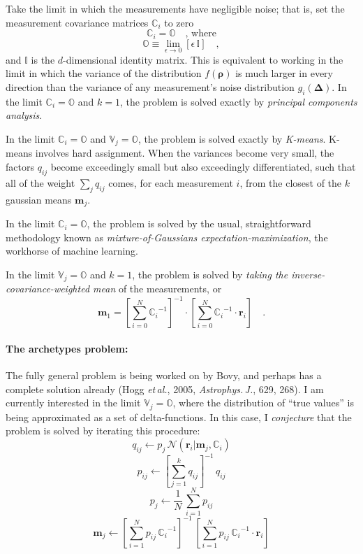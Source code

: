\documentclass[12pt]{article}
\newcommand{\etal}{\emph{et\,al.}}
\newcommand{\ApJ}{\emph{Astrophys.\,J.}}
\newcommand{\Mvector}[1]{\boldsymbol{#1}}
\newcommand{\measurement}{\Mvector{r}}
\newcommand{\truepoint}{\Mvector{\rho}}
\newcommand{\noise}{\Mvector{\Delta}}
\newcommand{\measurementi}{\measurement_i}
\newcommand{\mean}{\Mvector{m}}
\newcommand{\meanj}{\mean_j}
\newcommand{\truedist}{f}
\newcommand{\noisedisti}{g_i}
\newcommand{\gaussian}{\mathcal{N}\!}
\newcommand{\ampj}{p_j}
\newcommand{\ampij}{q_{ij}}
\newcommand{\normampij}{p_{ij}}
\newcommand{\Mmatrix}[1]{\mathbb{#1}}
\newcommand{\varj}{\Mmatrix{V}_j}
\newcommand{\covari}{\Mmatrix{C}_i}
\newcommand{\zero}{\Mmatrix{O}}
\newcommand{\identity}{\Mmatrix{I}}
\newcommand{\inverse}[1]{{#1}^{-1}}
\newcommand{\invcovari}{\inverse{\covari}}
\begin{document}
Take the limit in which the measurements have negligible noise;
that is, set the measurement covariance matrices $\covari$ to zero
\begin{equation}
\covari = \zero \quad \mbox{, where}
\end{equation}
\begin{equation}
\zero \equiv \lim_{\epsilon \rightarrow 0} [\epsilon\,\identity]
\quad ,
\end{equation}
and $\identity$ is the $d$-dimensional identity matrix.  This is
equivalent to working in the limit in which the variance of the
distribution $\truedist(\truepoint)$ is much larger in every direction
than the variance of any measurement's noise distribution
$\noisedisti(\noise)$.  In the limit $\covari=\zero$ and $k=1$, the
problem is solved exactly by \emph{principal components analysis}.

In the limit $\covari=\zero$ and $\varj=\zero$, the problem is solved
exactly by \emph{K-means}.  K-means involves hard assignment.  When
the variances become very small, the factors $\ampij$ become
exceedingly small but also exceedingly differentiated, such that all
of the weight $\sum_j\ampij$ comes, for each measurement $i$, from the
closest of the $k$ gaussian means $\meanj$.

In the limit $\covari=\zero$, the problem is solved by the usual,
straightforward methodology known as \emph{mixture-of-Gaussians
expectation-maximization}, the workhorse of machine learning.

In the limit $\varj=\zero$ and $k=1$, the problem is solved by
\emph{taking the inverse-covariance-weighted mean} of the
measurements, or
\begin{equation}
\mean_1 = \inverse{\left[
  \sum_{i=0}^N \invcovari
\right]}\cdot\left[
  \sum_{i=0}^N \invcovari\cdot\measurementi
\right]
\quad .
\end{equation}

\paragraph{The archetypes problem:}
The fully general problem is being worked on by Bovy, and perhaps has
a complete solution already (Hogg \etal, 2005, \ApJ, 629, 268).  I am
currently interested in the limit $\varj=\zero$, where the
distribution of ``true values'' is being approximated as a set of
delta-functions.  In this case, I \emph{conjecture} that the problem
is solved by iterating this procedure:
\begin{equation}
\ampij \leftarrow \ampj\,\gaussian(\measurementi|\meanj,\covari)
\end{equation}
\begin{equation}
\normampij \leftarrow \inverse{\left[
  \sum_{j=1}^k\ampij
\right]}\,\ampij
\end{equation}
\begin{equation}
\ampj \leftarrow \frac{1}{N}\,\sum_{i=1}^N\normampij
\end{equation}
\begin{equation}
\meanj \leftarrow \inverse{\left[
  \sum_{i=1}^N\normampij\,\invcovari
\right]}\,\left[
  \sum_{i=1}^N\normampij\,\invcovari\cdot\measurementi
\right]
\end{equation}
\end{document}
